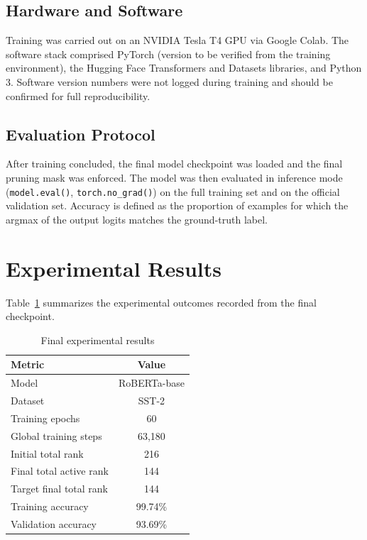 \documentclass[conference]{IEEEtran}
\begin{document}
\subsection{Hardware and Software}
Training was carried out on an NVIDIA Tesla T4 GPU via Google
Colab. The software stack comprised PyTorch (version to be
verified from the training environment), the Hugging Face
Transformers and Datasets libraries, and Python 3. Software
version numbers were not logged during training and should be
confirmed for full reproducibility.

\subsection{Evaluation Protocol}
After training concluded, the final model checkpoint was
loaded and the final pruning mask was enforced. The model was
then evaluated in inference mode (\texttt{model.eval()},
\texttt{torch.no\_grad()}) on the full training set and on the
official validation set. Accuracy is defined as the proportion
of examples for which the argmax of the output logits matches
the ground-truth label.

\section{Experimental Results}
\label{sec:results}

Table~\ref{tab:results} summarizes the experimental outcomes
recorded from the final checkpoint.

\begin{table}[t]
  \centering
  \caption{Final experimental results}
  \label{tab:results}
  \begin{tabular}{lc}
    \toprule
    \textbf{Metric} & \textbf{Value} \\
    \midrule
    Model                      & RoBERTa-base \\
    Dataset                    & SST-2 \\
    Training epochs            & 60 \\
    Global training steps      & 63,180 \\
    Initial total rank         & 216 \\
    Final total active rank    & 144 \\
    Target final total rank    & 144 \\
    Training accuracy          & 99.74\% \\
    Validation accuracy        & 93.69\% \\
    \bottomrule
  \end{tabular}
\end{table}
\end{document}

